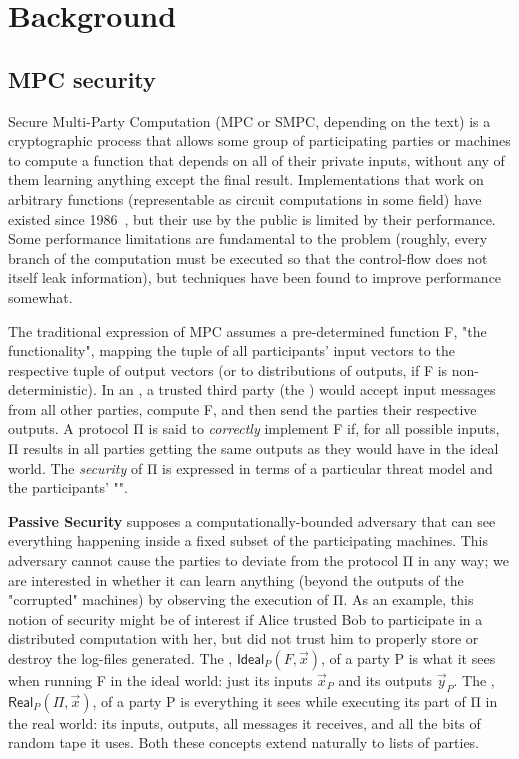 \documentclass[compsoc, conference, a4paper, 10pt, times]{IEEEtran}
\renewcommand{\paragraph}[1]{\vspace*{2pt}\noindent\textbf{#1}}
\begin{document}
\section{Background}

\subsection{MPC security}

Secure Multi-Party Computation (MPC or SMPC, depending on the text)
is a cryptographic process that allows some group of participating parties or machines
to compute a function that depends on all of their private inputs,
without any of them learning anything except the final result.
Implementations that work on arbitrary functions (representable as circuit computations in some field)
have existed since 1986~\cite{yao86}, %
but their use by the public is limited by their performance.
Some performance limitations are fundamental to the problem
(roughly, every branch of the computation must be executed so that the control-flow does not itself leak information),
but techniques have been found to improve performance somewhat.

The traditional expression of MPC assumes a pre-determined function F, "the functionality",
mapping the tuple of all participants' input vectors to the respective tuple of output vectors
(or to distributions of outputs, if F is non-deterministic).
In an , a trusted third party (the ) would accept input messages
from all other parties, compute F, and then send the parties their respective outputs.
A  protocol Π is said to \textit{correctly} implement F if, for all possible inputs,
Π results in all parties getting the same outputs as they would have in the ideal world.
The \textit{security} of Π is expressed in terms of a particular threat model and the participants' "".

\paragraph{Passive Security}
supposes a computationally-bounded adversary
that can see everything happening inside a fixed subset of the participating machines.
This adversary cannot cause the parties to deviate from the protocol Π in any way;
we are interested in whether it can learn anything (beyond the outputs of the "corrupted" machines)
by observing the execution of Π.
As an example, this notion of security might be of interest if Alice trusted Bob to participate
in a distributed computation with her, but did not trust him to properly store or destroy the log-files
generated.
The , $\mathsf{Ideal}_P(F,\vec{x})$, of a party P is what it sees when running F in the ideal world:
just its inputs $\vec{x}_P$ and its outputs $\vec{y}_P$.
The , $\mathsf{Real}_P(Π, \vec{x})$, of a party P is everything it sees while executing its part of Π in the real world:
its inputs, outputs, all messages it receives, and all the bits of random tape it uses.
Both these concepts extend naturally to lists of parties.
\end{document}
